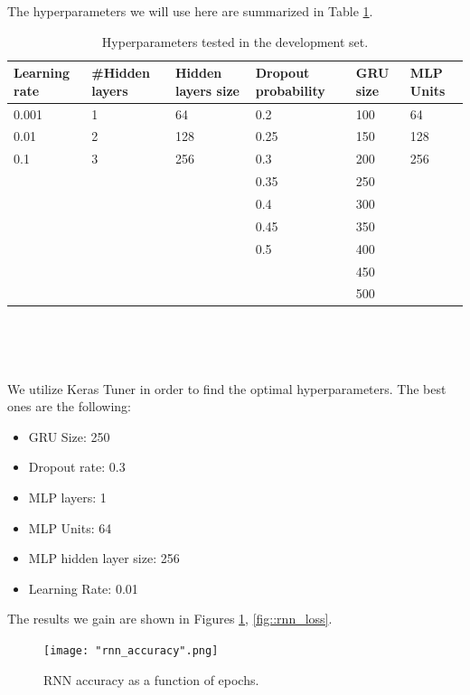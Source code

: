 \documentclass[10pt, a4paper]{article}
\begin{document}
	The hyperparameters we will use here are summarized in Table \ref{tab::ex-1-hyper}.
	
	\begin{table}
		\centering
		\begin{tabular}{|l|l|l|l|l|l|}
			\hline
			\rowcolor{blue!25}\textbf{Learning rate} & \cellcolor{blue!25}\textbf{\#Hidden layers} & \cellcolor{blue!25}\textbf{Hidden layers size} & \cellcolor{blue!25}\textbf{Dropout probability} & \cellcolor{blue!25}\textbf{GRU size}  & \cellcolor{blue!25}\textbf{MLP Units}\\
			\hline
			0.001 & 1 & 64 & 0.2 & 100 & 64\\
			\hline
			0.01 & 2 & 128 & 0.25 & 150 & 128\\
			\hline
			0.1 & 3 & 256 & 0.3 & 200 & 256 \\
			\hline 
			& & & 0.35 & 250 & \\
			\hline 
			& & & 0.4 & 300 &\\
			\hline 
			& & & 0.45 & 350 &\\
			\hline 
			& & & 0.5 & 400 &\\
			\hline 
			& & &  & 450 &\\
			\hline 
			& & & & 500 & \\
			
			
			
			\hline
		\end{tabular}
		\caption{Hyperparameters tested in the development set.}
		\label{tab::ex-1-hyper}
	\end{table}
	
	\ 
	
	
	\
	
	We utilize Keras Tuner in order to find the optimal hyperparameters. The best ones are the following:
	\begin{itemize}
		\item GRU Size: 250
		\item Dropout rate: 0.3
		\item MLP layers: 1
		\item MLP Units: 64
		\item MLP hidden layer size: 256
		\item Learning Rate: 0.01
	\end{itemize}
	
	The results we gain are shown in Figures \ref{fig::rnn_accuracy}, \ref{fig::rnn_loss}.
	
	\begin{figure}
		\centering
		\texttt{[image: "rnn\_accuracy".png]}
		\caption{RNN accuracy as a function of epochs.}
		\label{fig::rnn_accuracy}
	\end{figure}
	
\end{document}
